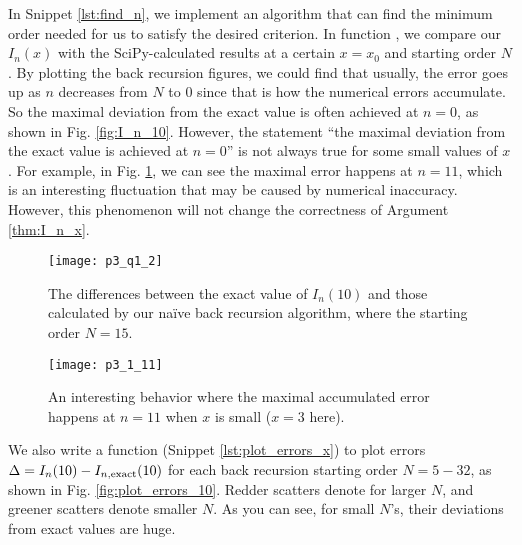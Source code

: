 In Snippet \ref{lst:find_n}, we implement an algorithm that can find the minimum order
needed for us to satisfy the desired criterion. In function , we compare
our $I_n(x)$ with the SciPy-calculated results at a certain $x = x_0$ and starting order $N$.
By plotting the back recursion figures, we could find that usually, the error goes up
as $n$ decreases from $N$ to $0$ since that is how the numerical errors accumulate.
So the maximal deviation from the exact value is often achieved at $n = 0$, as shown in
Fig. \ref{fig:I_n_10}. However, the statement ``the maximal deviation from the exact value
is achieved at $n = 0$'' is not always true for some small values of $x$. For example,
in Fig. \ref{fig:I_n_3}, we can see the maximal error happens at $n = 11$, which is an
interesting fluctuation that may be caused by numerical inaccuracy. However, this phenomenon
will not change the correctness of Argument \ref{thm:I_n_x}.

\begin{figure}[H] %
    \centering
    \begin{minipage}[t]{0.45\linewidth}
        \centering
        \texttt{[image: p3\_q1\_2]}
        \caption{The differences between the exact value of $I_n(10)$ and those calculated by
            our naïve back recursion algorithm, where the starting order $N = 15$.}
        \label{fig:I_n_10}
    \end{minipage}
    \hfil
    \begin{minipage}[t]{0.45\linewidth}
        \centering
        \texttt{[image: p3\_1\_11]}
        \caption{An interesting behavior where the maximal accumulated error happens at
            $n = 11$ when $x$ is small ($x = 3$ here).}
        \label{fig:I_n_3}
    \end{minipage}
\end{figure}

We also write a function  (Snippet \ref{lst:plot_errors_x}) to
plot errors $\Delta = I_n(10) - I_{n,\textnormal{exact}}(10)$ for each
back recursion starting order $N = 5 - 32$, as shown in Fig. \ref{fig:plot_errors_10}.
Redder scatters denote for larger $N$, and greener scatters denote
smaller $N$. As you can see, for small $N$'s, their deviations from exact values are huge.

